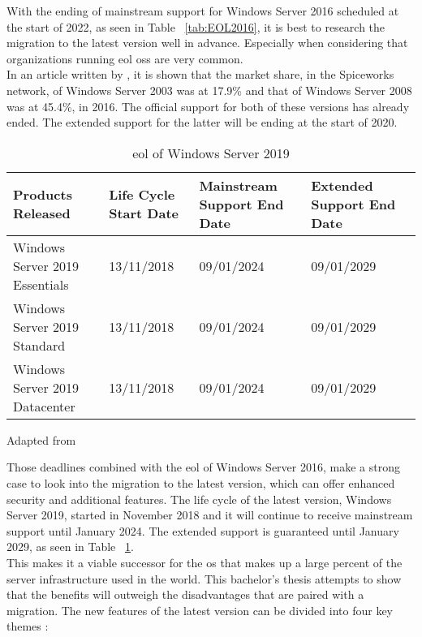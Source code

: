 With the ending of mainstream support for Windows Server 2016 scheduled at the start of 2022, as seen in Table ~\ref{tab:EOL2016}, it is best to research the migration to the latest version well in advance. 
Especially when considering that organizations running \acrfull{eol} \acrshort{os}s are very common. \\
In an article written by \textcite{Tsai2016}, it is shown that the market share, in the Spiceworks network, of Windows Server 2003 was at 17.9\% and that of Windows Server 2008 was at 45.4\%, in 2016. 
The official support for both of these versions has already ended. The extended support for the latter will be ending at the start of 2020. 

\begin{table}[ht]
	\centering
	\begin{adjustbox}{width=1\textwidth}
		\begin{tabular}{l|l|l|ll}
			Products Released & Life Cycle Start Date & Mainstream Support End Date & Extended Support End Date &\\
			\hline
			Windows Server 2019 Essentials & 13/11/2018 & 09/01/2024 & 09/01/2029 &\\
			Windows Server 2019 Standard & 13/11/2018 & 09/01/2024 & 09/01/2029 &\\
			Windows Server 2019 Datacenter & 13/11/2018 & 09/01/2024 & 09/01/2029 &\\
		\end{tabular}
	\end{adjustbox}
	\caption[\acrshort{eol} \acrshort{ws}2019]{\acrshort{eol} of Windows Server 2019}
	\scriptsize	
	Adapted from \cite{MicrosoftEOL2019}
	\label{tab:EOL2019}
\end{table}

Those deadlines combined with the \acrshort{eol} of Windows Server 2016, make a strong case to look into the migration to the latest version, which can offer enhanced security and additional features. 
The life cycle of the latest version, Windows Server 2019, started in November 2018 and it will continue to receive mainstream support until January 2024. 
The extended support is guaranteed until January 2029, as seen in Table ~\ref{tab:EOL2019}.\\
This makes it a viable successor for the \acrshort{os} that makes up a large percent of the server infrastructure used in the world. 
This bachelor's thesis attempts to show that the benefits will outweigh the disadvantages that are paired with a migration. 
The new features of the latest version can be divided into four key themes \autocite{MWST2018}:

